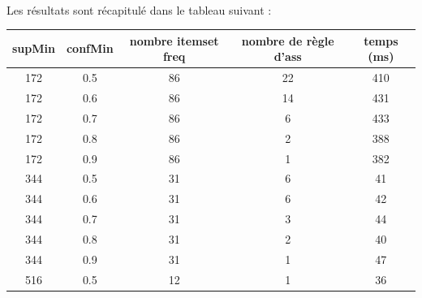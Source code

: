			\paragraph{}
			Les résultats sont récapitulé dans le tableau suivant : 
			\begin{table}[H]
				\centering
				\begin{tabular}{|c|c|c|c|c|}
					\hline
					\textbf{supMin} & \textbf{confMin} & \textbf{nombre itemset freq} & \textbf{nombre de règle d'ass} & \textbf{temps (ms)} \\ \hline
					172             & 0.5              & 86                           & 22                             & 410            \\ \hline
					172             & 0.6              & 86                           & 14                             & 431            \\ \hline
					172             & 0.7              & 86                           & 6                              & 433            \\ \hline
					172             & 0.8              & 86                           & 2                              & 388            \\ \hline
					172             & 0.9              & 86                           & 1                              & 382            \\ \hline
					344             & 0.5              & 31                           & 6                              & 41             \\ \hline
					344             & 0.6              & 31                           & 6                              & 42             \\ \hline
					344             & 0.7              & 31                           & 3                              & 44             \\ \hline
					344             & 0.8              & 31                           & 2                              & 40             \\ \hline
					344             & 0.9              & 31                           & 1                              & 47             \\ \hline
					516             & 0.5              & 12                           & 1                              & 36             \\ \hline

\end{tabular}
\end{table}
